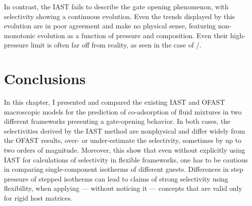 \documentclass[thesis]{subfiles}
\begin{document}
In contrast, the IAST fails to describe the gate opening phenomenon, with
selectivity showing a continuous evolution. Even the trends displayed by this
evolution are in poor agreement and make no physical sense, featuring
non-monotonic evolution as a function of pressure and composition. Even their
high-pressure limit is often far off from reality, as seen in the case of
/.

\newpage
\section*{Conclusions}


In this chapter, I presented and compared the existing IAST and OFAST
macroscopic models for the prediction of co-adsorption of fluid mixtures in two
different frameworks presenting a gate-opening behavior. In both cases, the
selectivities derived by the IAST method are nonphysical and differ widely from
the OFAST results, over- or under-estimate the selectivity, sometimes by up to
two orders of magnitude.  Moreover, this show that even without explicitly using
IAST for calculations of selectivity in flexible frameworks, one has to be
cautious in comparing single-component isotherms of different guests.
Differences in step pressure of stepped isotherms can lead to claims of strong
selectivity using flexibility, when applying --- without noticing it ---
concepts that are valid only for rigid host matrices.
\end{document}
